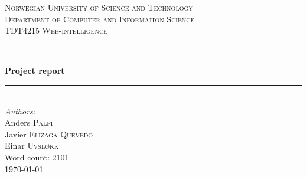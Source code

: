 \documentclass[11pt,a4paper]{report}
\newcommand{\HRule}{\rule{\linewidth}{0.5mm}}
\begin{document}
\begin{titlepage}
\center
\textsc{\Large Norwegian University of Science and Technology}\\[1.5cm]
\textsc{\large Department of Computer and Information Science}\\[0.5cm]
\textsc{TDT4215 Web-intelligence}\\[0.5cm]

\HRule \\[0.5cm]
{\huge \bfseries Project report}\\[0.2cm]
\HRule \\[1.5cm]

\Large \emph{Authors:}\\
Anders \textsc{Palfi}\\
Javier \textsc{Elizaga Quevedo}\\
Einar \textsc{Uvsløkk}\\[3cm]

{\large Word count: 2101}\\
{\large \today}\\[3cm]

\vfill

\end{titlepage}


\tableofcontents

\listoffigures
{}










%
%


\end{document}
